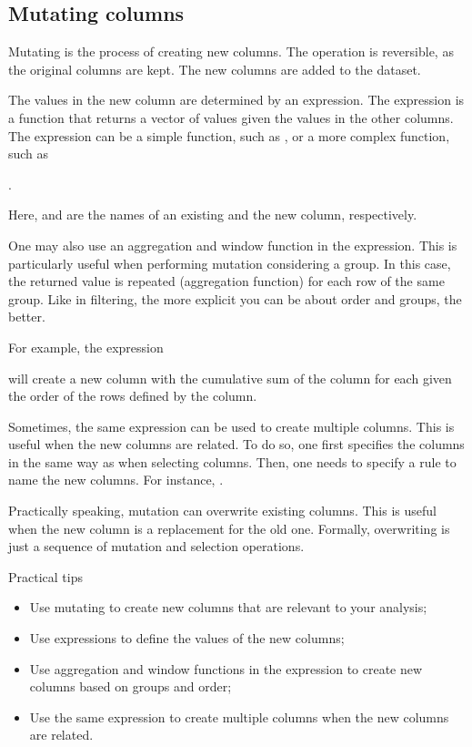 \subsection{Mutating columns}

Mutating is the process of creating new columns.  The operation is reversible, as the
original columns are kept.  The new columns are added to the dataset.

The values in the new column are determined by an expression.  The expression is a
function that returns a vector of values given the values in the other columns.  The
expression can be a simple function, such as , or a more complex
function, such as
\begin{center}
  .
\end{center}
Here,  and  are
the names of an existing and the new column, respectively.

One may also use an aggregation and window function in the expression. This is particularly
useful when performing mutation considering a group.  In this case, the returned value is
repeated (aggregation function) for each row of the same group.  Like in filtering, the
more explicit you can be about order and groups, the better.

For example, the expression
\begin{center}
\end{center}
will create a new column  with the cumulative sum of the  column for each
 given the order of the rows defined by the  column.

Sometimes, the same expression can be used to create multiple columns.  This is useful
when the new columns are related.  To do so, one first specifies the columns in the same way as
when selecting columns.  Then, one needs to specify a rule to name the new columns.
For instance, .

Practically speaking, mutation can overwrite existing columns.  This is useful when the
new column is a replacement for the old one.  Formally, overwriting is just a sequence of
mutation and selection operations.

\begin{hlbox}{Practical tips}
  \begin{itemize}
    \item Use mutating to create new columns that are relevant to your analysis;
    \item Use expressions to define the values of the new columns;
    \item Use aggregation and window functions in the expression to create new columns based on
      groups and order;
    \item Use the same expression to create multiple columns when the new columns are related.
  \end{itemize}
\end{hlbox}

